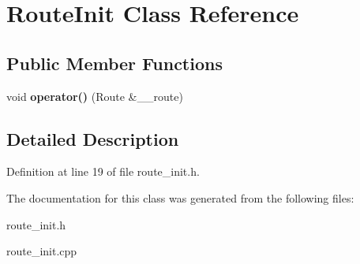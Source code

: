 \section{RouteInit Class Reference}
\label{class_route_init}
\subsection*{Public Member Functions}
\begin{CompactItemize}
\item 
void {\bf operator()} (Route \&\_\-\_\-route)\label{class_route_init_b65a7137e114458faadb6a5510c001f7}

\end{CompactItemize}


\subsection{Detailed Description}




Definition at line 19 of file route\_\-init.h.

The documentation for this class was generated from the following files:\begin{CompactItemize}
\item 
route\_\-init.h\item 
route\_\-init.cpp\end{CompactItemize}
